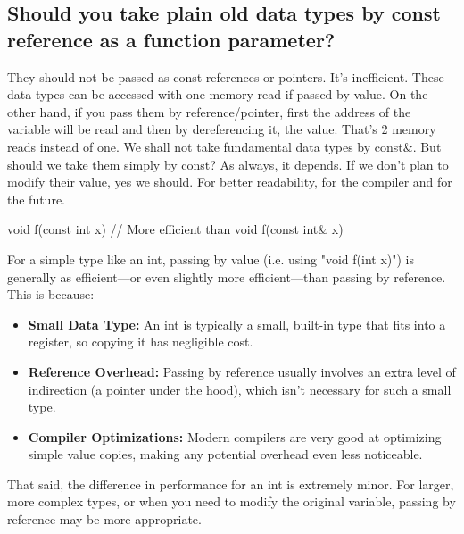 \documentclass{report}
\begin{document}
\bigbreak \noindent 
\subsection{Should you take plain old data types by const reference as a function parameter?}
\bigbreak \noindent 
They should not be passed as const references or pointers. It’s
inefficient. These data types can be accessed with one memory
read if passed by value. On the other hand, if you pass them by
reference/pointer, first the address of the variable will be read and
then by dereferencing it, the value. That’s 2 memory reads instead
of one.
\bigbreak \noindent 
We shall not take fundamental data types by const\&.
\bigbreak \noindent 
But should we take them simply by const? As always, it depends. If we don’t plan to modify their value, yes we should. For better readability, for the compiler and for the future.
\bigbreak \noindent 
\begin{cppcode}
    void f(const int x) { }
    // More efficient than 
    void f(const int& x) {}
\end{cppcode}
\bigbreak \noindent 
For a simple type like an int, passing by value (i.e. using "void f(int x)") is generally as efficient—or even slightly more efficient—than passing by reference. This is because:
\bigbreak \noindent 
\begin{itemize}
    \item \textbf{Small Data Type:} An int is typically a small, built-in type that fits into a register, so copying it has negligible cost.
    \item \textbf{Reference Overhead:} Passing by reference usually involves an extra level of indirection (a pointer under the hood), which isn’t necessary for such a small type.
    \item \textbf{Compiler Optimizations:} Modern compilers are very good at optimizing simple value copies, making any potential overhead even less noticeable.
\end{itemize}
That said, the difference in performance for an int is extremely minor. For larger, more complex types, or when you need to modify the original variable, passing by reference may be more appropriate.




















 
\end{document}
